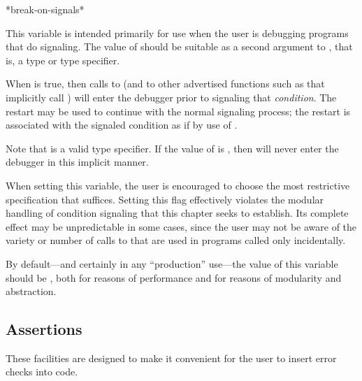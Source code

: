 \begin{defun}[Variable]
*break-on-signals*

This variable is intended primarily for use when the user is debugging programs
that do signaling.  The value of  should be suitable as a
second argument to , that is, a type or type specifier.

When  is true, then calls to
 (and to other advertised functions such as  that
implicitly call ) will enter the debugger prior to signaling that
\emph{condition}. The  restart may be used to continue with the
normal signaling process; the restart is associated with the signaled condition
as if by use of .

Note that  is a valid type specifier.  If the value of
 is , then  will never enter the
debugger in this implicit manner.

When setting this variable, the user is encouraged to choose the most
restrictive specification that suffices. Setting this flag effectively violates
the modular handling of condition signaling that this chapter seeks to
establish. Its complete effect may be unpredictable in some cases, since the
user may not be aware of the variety or number of calls to  that are
used in programs called only incidentally.

By default---and certainly in any ``production'' use---the value of this
variable should be , both for reasons of performance and for reasons of
modularity and abstraction.
\end{defun}

\subsection{Assertions}
\label{CONDITION-ASSERTIONS}

These facilities are designed to make it convenient for the user
to insert error checks into code.

